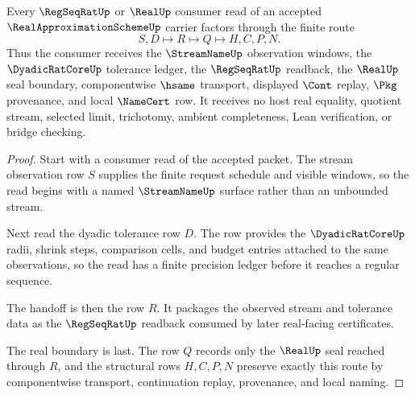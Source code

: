 \begin{theorem}
\label{thm:real-approximation-scheme-regseqrat-handoff}
Every $\RegSeqRatUp$ or $\RealUp$ consumer read of an accepted $\RealApproximationSchemeUp$ carrier factors through the finite route
$$
S,D \longmapsto R \longmapsto Q \longmapsto H,C,P,N .
$$
Thus the consumer receives the $\StreamNameUp$ observation windows, the $\DyadicRatCoreUp$ tolerance ledger, the $\RegSeqRatUp$ readback, the $\RealUp$ seal boundary, componentwise $\hsame$ transport, displayed $\Cont$ replay, $\Pkg$ provenance, and local $\NameCert$ row. It receives no host real equality, quotient stream, selected limit, trichotomy, ambient completeness, Lean verification, or bridge checking.
\end{theorem}

\begin{proof}
Start with a consumer read of the accepted packet. The stream observation row $S$ supplies the finite request schedule and visible windows, so the read begins with a named $\StreamNameUp$ surface rather than an unbounded stream.

Next read the dyadic tolerance row $D$. The row provides the $\DyadicRatCoreUp$ radii, shrink steps, comparison cells, and budget entries attached to the same observations, so the read has a finite precision ledger before it reaches a regular sequence.

The handoff is then the row $R$. It packages the observed stream and tolerance data as the $\RegSeqRatUp$ readback consumed by later real-facing certificates.

The real boundary is last. The row $Q$ records only the $\RealUp$ seal reached through $R$, and the structural rows $H,C,P,N$ preserve exactly this route by componentwise transport, continuation replay, provenance, and local naming.
\end{proof}


\begin{closurestatus}{\RealApproximationSchemeUp}
  \theoryclosure{\seedClosure}
  \formalstatus{\unformalizedV}
\end{closurestatus}
